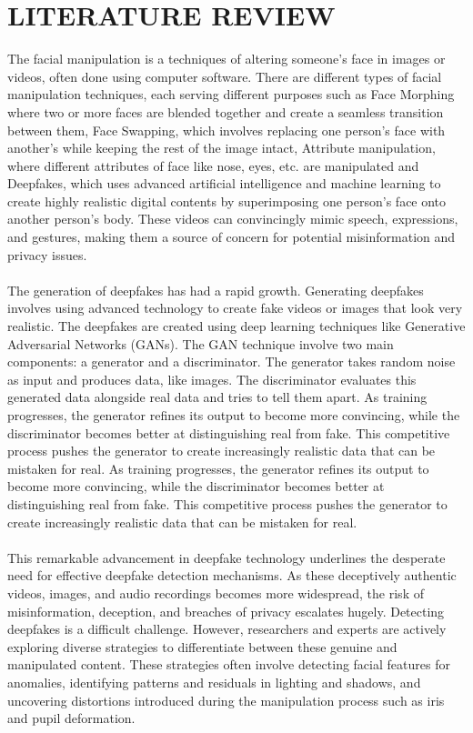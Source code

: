 \section{LITERATURE REVIEW}

The facial manipulation is a techniques of altering someone's face in images or videos, often done using computer software. There are different types of facial manipulation techniques, each serving different purposes such as Face Morphing where two or more faces are blended together and create a seamless transition between them, Face Swapping, which involves replacing one person's face with another's while keeping the rest of the image intact, Attribute manipulation, where different attributes of face like nose, eyes, etc. are manipulated and Deepfakes, which uses advanced artificial intelligence and machine learning to create highly realistic digital contents by superimposing one person's face onto another person's body. These videos can convincingly mimic speech, expressions, and gestures, making them a source of concern for potential misinformation and privacy issues.
\\\\
The generation of deepfakes has had a rapid growth. Generating deepfakes involves using advanced technology to create fake videos or images that look very realistic. The deepfakes are created using deep learning techniques like Generative Adversarial Networks (GANs). The GAN technique involve two main components: a generator and a discriminator. The generator takes random noise as input and produces data, like images. The discriminator evaluates this generated data alongside real data and tries to tell them apart. As training progresses, the generator refines its output to become more convincing, while the discriminator becomes better at distinguishing real from fake. This competitive process pushes the generator to create increasingly realistic data that can be mistaken for real. As training progresses, the generator refines its output to become more convincing, while the discriminator becomes better at distinguishing real from fake. This competitive process pushes the generator to create increasingly realistic data that can be mistaken for real. 
\\\\
This remarkable advancement in deepfake technology underlines the desperate need for effective deepfake detection mechanisms. As these deceptively authentic videos, images, and audio recordings becomes more widespread, the risk of misinformation, deception, and breaches of privacy escalates hugely. Detecting deepfakes is a difficult challenge. However, researchers and experts are actively exploring diverse strategies to differentiate between these genuine and manipulated content. These strategies often involve detecting facial features for anomalies, identifying patterns and residuals in lighting and shadows, and uncovering distortions introduced during the manipulation process such as iris and pupil deformation.
